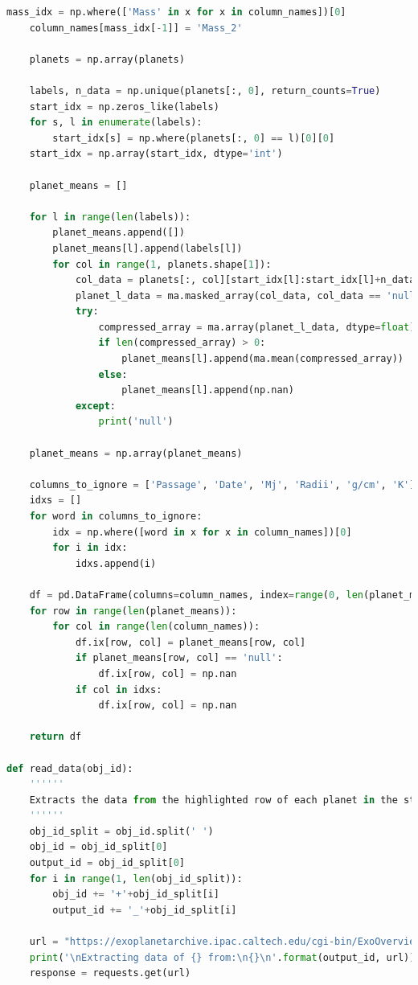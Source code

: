 \documentclass[11pt, oneside]{article}   	%
\begin{document}
\begin{lstlisting}[language=Python, caption={Extracting data from \href{https://exoplanetarchive.ipac.caltech.edu/}{Nasa Exoplanet Archive}}]
    mass_idx = np.where(['Mass' in x for x in column_names])[0]
    column_names[mass_idx[-1]] = 'Mass_2'

    planets = np.array(planets)

    labels, n_data = np.unique(planets[:, 0], return_counts=True)
    start_idx = np.zeros_like(labels)
    for s, l in enumerate(labels):
        start_idx[s] = np.where(planets[:, 0] == l)[0][0]
    start_idx = np.array(start_idx, dtype='int')

    planet_means = []

    for l in range(len(labels)):
        planet_means.append([])
        planet_means[l].append(labels[l])
        for col in range(1, planets.shape[1]):
            col_data = planets[:, col][start_idx[l]:start_idx[l]+n_data[l]]
            planet_l_data = ma.masked_array(col_data, col_data == 'null').compressed()
            try:
                compressed_array = ma.array(planet_l_data, dtype=float)
                if len(compressed_array) > 0:
                    planet_means[l].append(ma.mean(compressed_array))
                else:
                    planet_means[l].append(np.nan)
            except:
                print('null')
    
    planet_means = np.array(planet_means)

    columns_to_ignore = ['Passage', 'Date', 'Mj', 'Radii', 'g/cm', 'K']
    idxs = []
    for word in columns_to_ignore:
        idx = np.where([word in x for x in column_names])[0]
        for i in idx:
            idxs.append(i)

    df = pd.DataFrame(columns=column_names, index=range(0, len(planet_means)))
    for row in range(len(planet_means)):
        for col in range(len(column_names)):
            df.ix[row, col] = planet_means[row, col]
            if planet_means[row, col] == 'null':
                df.ix[row, col] = np.nan
            if col in idxs:
                df.ix[row, col] = np.nan
    
    return df

def read_data(obj_id):
	''''''
	Extracts the data from the highlighted row of each planet in the star system.
	''''''
    obj_id_split = obj_id.split(' ')
    obj_id = obj_id_split[0]
    output_id = obj_id_split[0]
    for i in range(1, len(obj_id_split)):
        obj_id += '+'+obj_id_split[i]
        output_id += '_'+obj_id_split[i]

    url = "https://exoplanetarchive.ipac.caltech.edu/cgi-bin/ExoOverview/nph-ExoOverview?objname={}&type=&label&aliases&exo&iden&orb&ppar&tran&note&disc&ospar&ts&nalc&force=&dhxr1507830887922".format(obj_id)
    print('\nExtracting data of {} from:\n{}\n'.format(output_id, url))
    response = requests.get(url)


\end{lstlisting}
\end{document}
